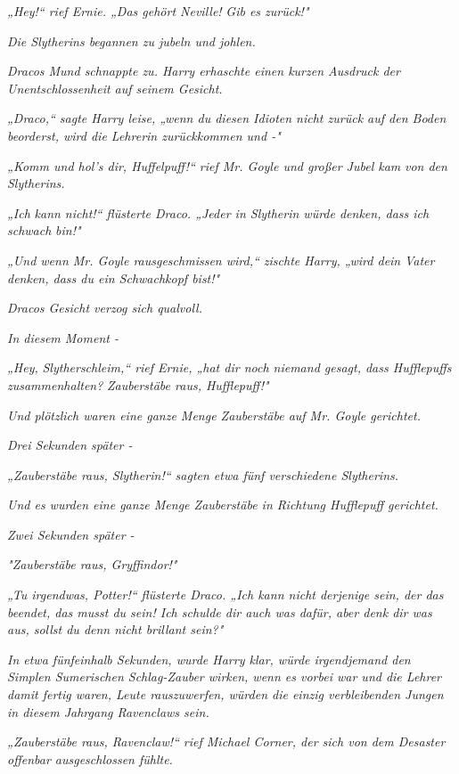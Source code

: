 {\emph{„\emph{Hey!}“ rief Ernie. „Das gehört Neville!} \emph{\emph{Gib es zurück!}"}

\emph{Die Slytherins begannen zu jubeln und johlen.}

\emph{Dracos Mund schnappte zu. Harry erhaschte einen kurzen Ausdruck der Unentschlossenheit auf seinem Gesicht.}

\emph{„Draco,“ sagte Harry leise, „wenn du diesen Idioten nicht zurück auf den Boden beorderst, wird die Lehrerin zurückkommen und -"}

\emph{„\emph{Komm und hol's dir, Huffelpuff!}“ rief Mr. Goyle und großer Jubel kam} \emph{von den Slytherins.}

\emph{„Ich} \emph{\emph{kann nicht!}“ flüsterte Draco. „Jeder in Slytherin würde denken, dass ich} \emph{\emph{schwach}} \emph{bin!"}

\emph{„Und wenn Mr. Goyle rausgeschmissen wird,“ zischte Harry, „wird dein} \emph{\emph{Vater}} \emph{denken, dass du ein Schwachkopf bist!"}

\emph{Dracos Gesicht verzog sich qualvoll.}

\emph{In diesem Moment -}

\emph{„Hey,} \emph{\emph{Slytherschleim,}“ rief Ernie, „hat dir noch niemand gesagt, dass Hufflepuffs zusammenhalten?} \emph{\emph{Zauberstäbe raus, Hufflepuff!}"}

\emph{Und plötzlich waren eine ganze Menge Zauberstäbe auf Mr. Goyle gerichtet.}

\emph{Drei Sekunden später -}

\emph{„\emph{Zauberstäbe raus, Slytherin!}“ sagten etwa fünf verschiedene Slytherins.}

\emph{Und es wurden eine ganze Menge Zauberstäbe in Richtung Hufflepuff gerichtet.}

\emph{Zwei Sekunden später -}

\emph{"\emph{Zauberstäbe raus, Gryffindor!}"}

\emph{„\emph{Tu irgendwas, Potter!}“ flüsterte Draco. „\emph{Ich kann nicht derjenige sein, der das beendet, das musst du sein! Ich schulde dir auch was dafür, aber denk dir was aus, sollst du denn nicht brillant sein?}"}

\emph{In etwa fünfeinhalb Sekunden, wurde Harry klar, würde irgendjemand den Simplen Sumerischen Schlag-Zauber wirken, wenn es vorbei war und die Lehrer damit fertig waren, Leute rauszuwerfen, würden die einzig verbleibenden Jungen in diesem Jahrgang Ravenclaws sein.}

\emph{„\emph{Zauberstäbe raus, Ravenclaw!}“ rief Michael Corner, der sich von dem Desaster offenbar ausgeschlossen fühlte.}

}
